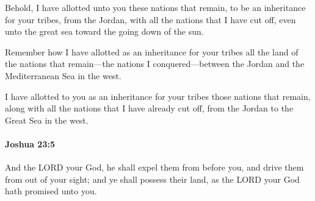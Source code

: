 			\begin{versebox}
					\item[BHS] 
					\item[ASV] Behold, I have allotted unto you these nations that remain, to be an inheritance for your tribes, from the Jordan, with all the nations that I have cut off, even unto the great sea toward the going down of the sun.
					\item[NIV] Remember how I have allotted as an inheritance for your tribes all the land of the nations that remain—the nations I conquered—between the Jordan and the Mediterranean Sea in the west.
					\item[NRSV] I have allotted to you as an inheritance for your tribes those nations that remain, along with all the nations that I have already cut off, from the Jordan to the Great Sea in the west.
			\end{versebox}

		\paragraph{Joshua 23:5} %
			\label{JOSHUA-23-5}

			And the LORD your God, he shall expel them from before you, and drive them from out of your sight; and ye shall possess their land, as the LORD your God hath promised unto you.

